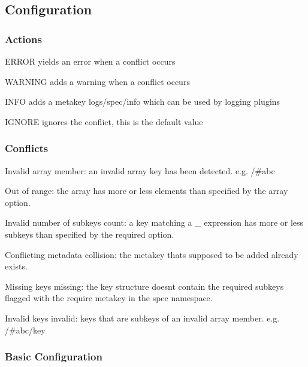\subsection*{Configuration}

\subsubsection*{Actions}


\begin{DoxyItemize}
\item {\ttfamily E\+R\+R\+OR} yields an error when a conflict occurs
\item {\ttfamily W\+A\+R\+N\+I\+NG} adds a warning when a conflict occurs
\item {\ttfamily I\+N\+FO} adds a metakey {\ttfamily logs/spec/info} which can be used by logging plugins
\item {\ttfamily I\+G\+N\+O\+RE} ignores the conflict, this is the default value
\end{DoxyItemize}

\subsubsection*{Conflicts}


\begin{DoxyItemize}
\item Invalid array {\ttfamily member}\+: an invalid array key has been detected. e.\+g. {\ttfamily /\#abc}
\item Out of {\ttfamily range}\+: the array has more or less elements than specified by the {\ttfamily array} option.
\item Invalid number of subkeys {\ttfamily count}\+: a key matching a {\ttfamily \+\_\+} expression has more or less subkeys than specified by the {\ttfamily required} option.
\item Conflicting metadata {\ttfamily collision}\+: the metakey that\textquotesingle{}s supposed to be added already exists.
\item Missing keys {\ttfamily missing}\+: the key structure doesn\textquotesingle{}t contain the required subkeys flagged with the {\ttfamily require} metakey in the {\ttfamily spec} namespace.
\item Invalid keys {\ttfamily invalid}\+: keys that are subkeys of an invalid array member. e.\+g. {\ttfamily /\#abc/key}
\end{DoxyItemize}

\subsubsection*{Basic Configuration}

